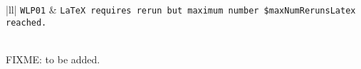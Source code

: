 \begin{longtable}{|ll|}
\texttt{\footnotesize WLP01} 
& \texttt{\footnotesize LaTeX requires rerun 
but maximum number \$maxNumRerunsLatex reached. } \\
 \\
\end{longtable}








  

FIXME\@: to be added. 
